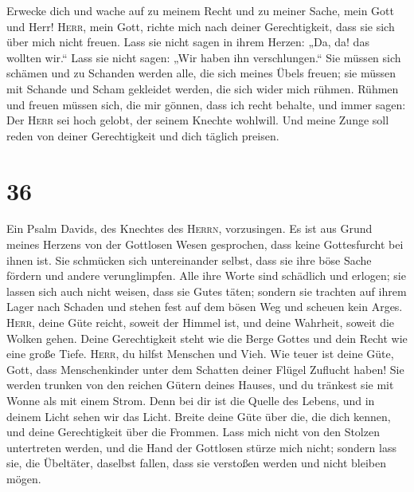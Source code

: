  Erwecke dich und wache auf zu meinem Recht und zu meiner
Sache, mein Gott und Herr!  \textsc{Herr}, mein Gott,
richte mich nach deiner Gerechtigkeit, dass sie sich über mich nicht
freuen.  Lass sie nicht sagen in ihrem Herzen: „Da, da!
das wollten wir.`` Lass sie nicht sagen: „Wir haben ihn verschlungen.``
 Sie müssen sich schämen und zu Schanden werden alle, die
sich meines Übels freuen; sie müssen mit Schande und Scham gekleidet
werden, die sich wider mich rühmen.  Rühmen und freuen
müssen sich, die mir gönnen, dass ich recht behalte, und immer sagen:
Der \textsc{Herr} sei hoch gelobt, der seinem Knechte wohlwill.
 Und meine Zunge soll reden von deiner Gerechtigkeit und
dich täglich preisen.

\hypertarget{section-35}{%
\section{36}\label{section-35}}

 Ein Psalm Davids, des Knechtes des \textsc{Herrn},
vorzusingen.  Es ist aus Grund meines Herzens von der
Gottlosen Wesen gesprochen, dass keine Gottesfurcht bei ihnen ist.
 Sie schmücken sich untereinander selbst, dass sie ihre
böse Sache fördern und andere verunglimpfen.  Alle ihre
Worte sind schädlich und erlogen; sie lassen sich auch nicht weisen,
dass sie Gutes täten;  sondern sie trachten auf ihrem
Lager nach Schaden und stehen fest auf dem bösen Weg und scheuen kein
Arges.  \textsc{Herr}, deine Güte reicht, soweit der
Himmel ist, und deine Wahrheit, soweit die Wolken gehen. 
Deine Gerechtigkeit steht wie die Berge Gottes und dein Recht wie eine
große Tiefe. \textsc{Herr}, du hilfst Menschen und Vieh. 
Wie teuer ist deine Güte, Gott, dass Menschenkinder unter dem Schatten
deiner Flügel Zuflucht haben!  Sie werden trunken von den
reichen Gütern deines Hauses, und du tränkest sie mit Wonne als mit
einem Strom.  Denn bei dir ist die Quelle des Lebens, und
in deinem Licht sehen wir das Licht.  Breite deine Güte
über die, die dich kennen, und deine Gerechtigkeit über die Frommen.
 Lass mich nicht von den Stolzen untertreten werden, und
die Hand der Gottlosen stürze mich nicht;  sondern lass
sie, die Übeltäter, daselbst fallen, dass sie verstoßen werden und nicht
bleiben mögen.

